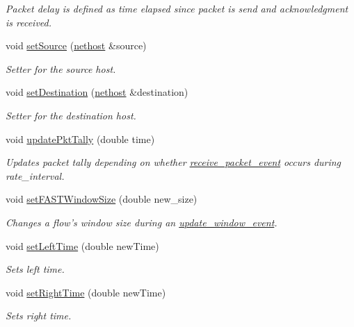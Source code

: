 \begin{DoxyCompactItemize}
\begin{DoxyCompactList}\small\item\em Packet delay is defined as time elapsed since packet is send and acknowledgment is received. \end{DoxyCompactList}\item 
void \hyperlink{classnetflow_afb017e85595e2d18ed839c26c5a37289}{set\-Source} (\hyperlink{classnethost}{nethost} \&source)
\begin{DoxyCompactList}\small\item\em Setter for the source host. \end{DoxyCompactList}\item 
void \hyperlink{classnetflow_a5ce0bbc79c6400fe89da80487f509415}{set\-Destination} (\hyperlink{classnethost}{nethost} \&destination)
\begin{DoxyCompactList}\small\item\em Setter for the destination host. \end{DoxyCompactList}\item 
void \hyperlink{classnetflow_a1b5aadc26000de914d77a0f18c3af2a9}{update\-Pkt\-Tally} (double time)
\begin{DoxyCompactList}\small\item\em Updates packet tally depending on whether {\ttfamily \hyperlink{classreceive__packet__event}{receive\-\_\-packet\-\_\-event}} occurs during rate\-\_\-interval. \end{DoxyCompactList}\item 
void \hyperlink{classnetflow_a9f3ef1670c996d54dbd32a1c941e2d83}{set\-F\-A\-S\-T\-Window\-Size} (double new\-\_\-size)
\begin{DoxyCompactList}\small\item\em Changes a flow's window size during an \hyperlink{classupdate__window__event}{update\-\_\-window\-\_\-event}. \end{DoxyCompactList}\item 
void \hyperlink{classnetflow_ad91146f3b19e8d2812e297714a4ef5d4}{set\-Left\-Time} (double new\-Time)
\begin{DoxyCompactList}\small\item\em Sets left time. \end{DoxyCompactList}\item 
void \hyperlink{classnetflow_a09b799f9166e0df50091a73516063c64}{set\-Right\-Time} (double new\-Time)
\begin{DoxyCompactList}\small\item\em Sets right time. \end{DoxyCompactList}\item 

\end{DoxyCompactItemize}
